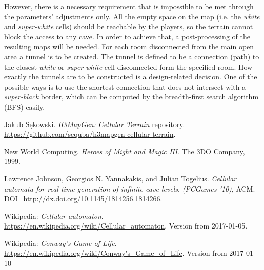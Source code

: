 \documentclass[a4paper, 11pt]{article} %
\begin{document}
However, there is a necessary requirement that is impossible to be met through the parameters' adjustments only. All the empty space on the map (i.e. the \emph{white} and \emph{super-white} cells) should be reachable by the players, so the terrain cannot block the access to any cave. In order to achieve that, a post-processing of the resulting maps will be needed. For each room disconnected from the main open area a tunnel is to be created. The tunnel is defined to be a connection (path) to the closest \emph{white} or \emph{super-white} cell disconnected form the specified room. How exactly the tunnels are to be constructed is a design-related decision. One of the possible ways is to use the shortest connection that does not intersect with a \emph{super-black} border, which can be computed by the breadth-first search algorithm (BFS) easily.




\begin{thebibliography}{9}
	
	Jakub Sękowski.
	\emph{H3MapGen: Cellular Terrain} repository.
	\url{https://github.com/sequba/h3mapgen-cellular-terrain}.

	New World Computing.
	\emph{Heroes of Might and Magic III}.
	The 3DO Company,
	1999.

	Lawrence Johnson, Georgios N. Yannakakis, and Julian Togelius.
	\emph{Cellular automata for real-time generation of infinite cave levels}.
	\emph{(PCGames '10)}, ACM.
	\url{DOI=http://dx.doi.org/10.1145/1814256.1814266}.

        Wikipedia: \emph{Cellular automaton}.
        \url{https://en.wikipedia.org/wiki/Cellular_automaton}.
        Version from 2017-01-05.

	Wikipedia: \emph{Conway's Game of Life}.
	\url{https://en.wikipedia.org/wiki/Conway's_Game_of_Life}.
	Version from 2017-01-10

\end{thebibliography}

\end{document}
